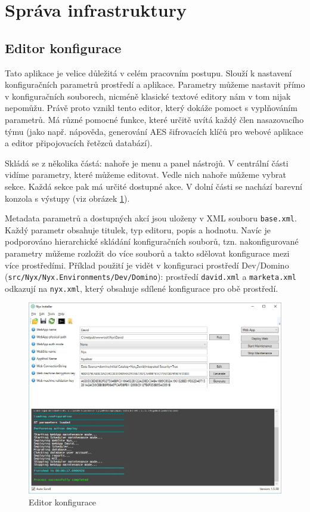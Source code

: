 \section{Správa infrastruktury}

\subsection{Editor konfigurace}
Tato aplikace je velice důležitá v celém pracovním postupu. Slouží k nastavení konfiguračních parametrů prostředí a aplikace. Parametry můžeme nastavit přímo v konfiguračních souborech,
nicméně klasické textové editory nám v tom nijak nepomůžu. Právě proto vznikl tento editor, který dokáže pomoct s vyplňováním parametrů. Má různé pomocné funkce, které určitě uvítá každý člen nasazovacího týmu (jako např. nápověda, generování AES šifrovacích klíčů pro webové aplikace a editor připojovacích řetězců databází).

Skládá se z několika částá: nahoře je menu a panel nástrojů. V centrální části vidíme parametry, které můžeme editovat. Vedle nich nahoře můžeme vybrat sekce. Každá sekce pak má určité dostupné akce. V dolní části se nachází barevní konzola s výstupy (viz obrázek \ref{fig:nyx_installer}).

Metadata parametrů a dostupných akcí jsou uloženy v XML souboru \texttt{base.xml}. Každý parametr obsahuje titulek, typ editoru, popis a hodnotu. Navíc je podporováno hierarchické skládání konfiguračních souborů, tzn. nakonfigurované parametry můžeme rozložit do více souborů a takto sdělovat konfigurace mezi více prostředími. Příklad použití je vidět v konfiguraci prostředí Dev/Domino (\texttt{src/Nyx/Nyx.Environments/Dev/Domino}): prostředí \texttt{david.xml} a \texttt{marketa.xml} odkazují na \texttt{nyx.xml}, který obsahuje sdílené konfigurace pro obě prostředí.

\begin{figure}[]
  \centering
  \includegraphics[width=14cm]{fig/installer.jpg}
  \caption{Editor konfigurace}
  \label{fig:nyx_installer}
\end{figure}

